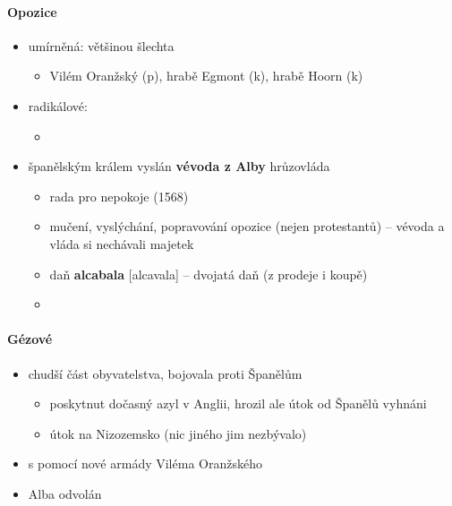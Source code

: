 \paragraph{Opozice}
\begin{itemize}
\item umírněná: většinou šlechta
	\begin{itemize}
	\item Vilém Oranžský (p), hrabě Egmont (k), hrabě Hoorn (k)
	\end{itemize}
\item radikálové:
	\begin{itemize}
	\item {}
	\end{itemize}
\item španělským králem vyslán \textbf{vévoda z Alby} \ra hrůzovláda 
\begin{itemize}
\item[\ra] rada pro nepokoje (1568)
\item mučení, vyslýchání, popravování opozice (nejen protestantů) -- vévoda a vláda si nechávali majetek
\item daň \textbf{alcabala} [alcavala] -- dvojatá daň (z prodeje i koupě)
\item {}
\end{itemize}
\end{itemize}

\paragraph{Gézové}
\begin{itemize}
\item chudší část obyvatelstva, bojovala proti Španělům
	\begin{itemize}
	\item poskytnut dočasný azyl v Anglii, hrozil ale útok od Španělů \ra vyhnáni
	\item[\ra] útok na Nizozemsko (nic jiného jim nezbývalo)
	\end{itemize}
\item {} s pomocí nové armády Viléma Oranžského
\item[\ra] Alba odvolán
\end{itemize}

